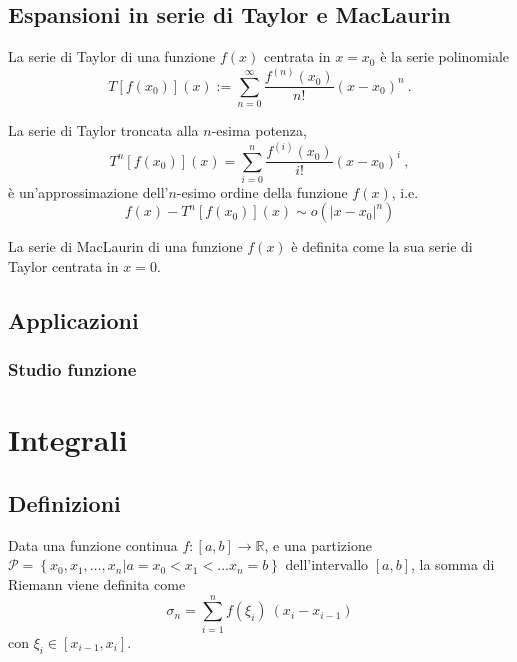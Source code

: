 \section{Espansioni in serie di Taylor e MacLaurin}\label{ch:taylor}
\begin{definition} La serie di Taylor di una funzione $f(x)$ centrata in $x=x_0$ è la serie polinomiale
\begin{equation}
   T[f(x_0)](x) := \sum_{n=0}^{\infty} \dfrac{f^{(n)}(x_0)}{n!} (x-x_0)^n \ .
\end{equation}
\end{definition}
%
\begin{theorem}
La serie di Taylor troncata alla $n$-esima potenza,
\begin{equation}
  T^n[f(x_0)](x) = \sum_{i=0}^{n} \dfrac{f^{(i)}(x_0)}{i!} (x-x_0)^i \ ,
\end{equation}
è un'approssimazione dell'$n$-esimo ordine della funzione $f(x)$, i.e.
\begin{equation}
  f(x) - T^n[f(x_0)](x) \sim o(|x-x_0|^{n})
\end{equation}
\end{theorem}

\begin{definition} La serie di MacLaurin di una funzione $f(x)$ è definita come la sua serie di Taylor centrata in $x=0$.
\end{definition}


\section{Applicazioni}
\subsection{Studio funzione}


\chapter{Integrali}\label{ch:integrals}

\section{Definizioni}
\begin{definition} Data una funzione continua $f:[a,b] \rightarrow \mathbb{R}$, e una partizione $\mathcal{P} = \left\{x_0, x_1, \dots, x_n | a = x_0 < x_1 < \dots x_n = b \right\}$ dell'intervallo $[a,b]$, la somma di Riemann viene definita come
    \begin{equation}
        \sigma_n = \sum_{i=1}^{n} f(\xi_i) \ (x_{i} - x_{i-1})
    \end{equation}
con $\xi_i \in [x_{i-1}, x_i]$.
\end{definition}

